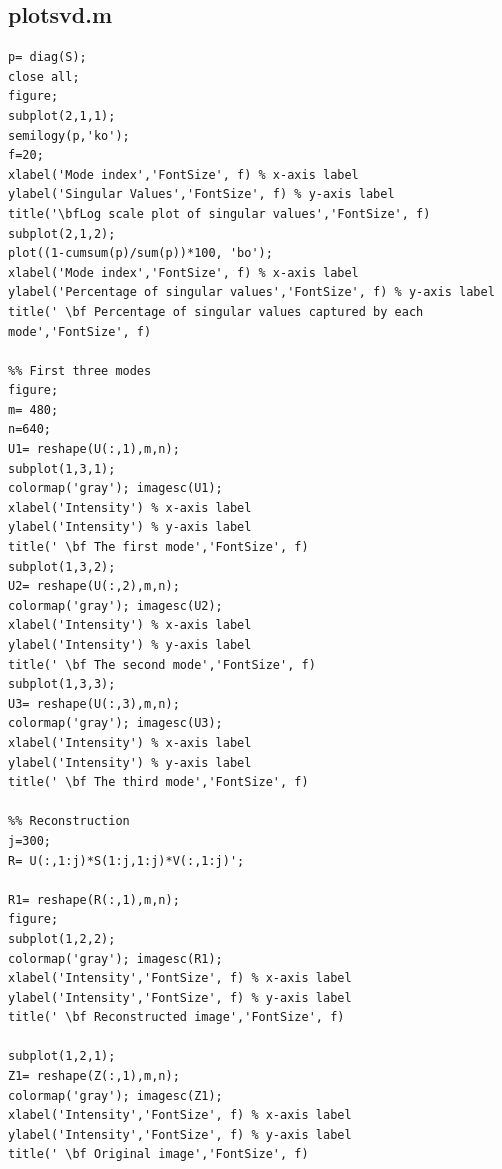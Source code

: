 \documentclass[a4paper]{article}
\begin{document}
\subsection{plotsvd.m}
\begin{lstlisting}[style=myMatlabstyle]
%% Mode statistics
p= diag(S);
close all;
figure;
subplot(2,1,1);
semilogy(p,'ko');
f=20;
xlabel('Mode index','FontSize', f) % x-axis label
ylabel('Singular Values','FontSize', f) % y-axis label
title('\bfLog scale plot of singular values','FontSize', f)
subplot(2,1,2);
plot((1-cumsum(p)/sum(p))*100, 'bo');
xlabel('Mode index','FontSize', f) % x-axis label
ylabel('Percentage of singular values','FontSize', f) % y-axis label
title(' \bf Percentage of singular values captured by each mode','FontSize', f)

%% First three modes
figure;
m= 480;
n=640;
U1= reshape(U(:,1),m,n);
subplot(1,3,1);
colormap('gray'); imagesc(U1);
xlabel('Intensity') % x-axis label
ylabel('Intensity') % y-axis label
title(' \bf The first mode','FontSize', f)
subplot(1,3,2);
U2= reshape(U(:,2),m,n);
colormap('gray'); imagesc(U2);
xlabel('Intensity') % x-axis label
ylabel('Intensity') % y-axis label
title(' \bf The second mode','FontSize', f)
subplot(1,3,3);
U3= reshape(U(:,3),m,n);
colormap('gray'); imagesc(U3);
xlabel('Intensity') % x-axis label
ylabel('Intensity') % y-axis label
title(' \bf The third mode','FontSize', f)

%% Reconstruction
j=300;
R= U(:,1:j)*S(1:j,1:j)*V(:,1:j)';

R1= reshape(R(:,1),m,n);
figure;
subplot(1,2,2);
colormap('gray'); imagesc(R1);
xlabel('Intensity','FontSize', f) % x-axis label
ylabel('Intensity','FontSize', f) % y-axis label
title(' \bf Reconstructed image','FontSize', f)

subplot(1,2,1);
Z1= reshape(Z(:,1),m,n);
colormap('gray'); imagesc(Z1);
xlabel('Intensity','FontSize', f) % x-axis label
ylabel('Intensity','FontSize', f) % y-axis label
title(' \bf Original image','FontSize', f)
\end{lstlisting}
\end{document}
